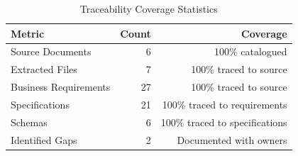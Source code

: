 \begin{table}[h]
\centering
\caption{Traceability Coverage Statistics}
\label{tab:coverage-statistics}
\begin{tabular}{@{}lrr@{}}
\toprule
\textbf{Metric} & \textbf{Count} & \textbf{Coverage} \\
\midrule
Source Documents & 6 & 100\% catalogued \\
Extracted Files & 7 & 100\% traced to source \\
Business Requirements & 27 & 100\% traced to source \\
Specifications & 21 & 100\% traced to requirements \\
Schemas & 6 & 100\% traced to specifications \\
Identified Gaps & 2 & Documented with owners \\
\bottomrule
\end{tabular}
\end{table}